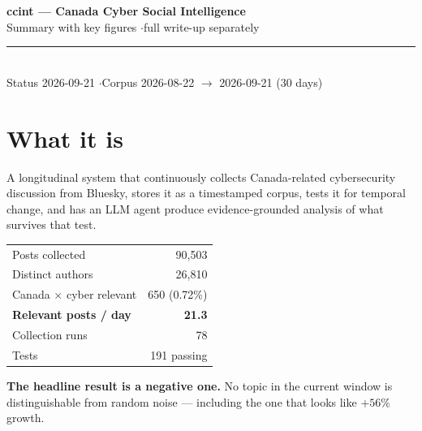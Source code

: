 \documentclass[10pt]{article}
\begin{document}
\begin{center}
{\LARGE\bfseries ccint --- Canada Cyber Social Intelligence}\\[0.3em]
{\normalsize Summary with key figures \quad$\cdot$\quad full write-up separately}\\[0.4em]
\textcolor{accent}{\rule{\textwidth}{0.9pt}}\\[0.2em]
{\footnotesize Status 2026-09-21 \quad$\cdot$\quad Corpus 2026-08-22 $\to$ 2026-09-21 (30 days)}
\end{center}
\vspace{-0.3em}

\section{What it is}

A longitudinal system that continuously collects Canada-related cybersecurity
discussion from Bluesky, stores it as a timestamped corpus, tests it for
temporal change, and has an LLM agent produce evidence-grounded analysis of
what survives that test.

\vspace{0.2em}
\begin{minipage}[t]{0.47\textwidth}
\small
\begin{tabular}{@{}lr@{}}
\toprule
Posts collected & 90{,}503 \\
Distinct authors & 26{,}810 \\
Canada $\times$ cyber relevant & 650 (0.72\%) \\
\textbf{Relevant posts / day} & \textbf{21.3} \\
Collection runs & 78 \\
Tests & 191 passing \\
\bottomrule
\end{tabular}
\end{minipage}\hfill
\begin{minipage}[t]{0.50\textwidth}
\vspace{-1.2em}
\begin{keybox}
\small
\textbf{The headline result is a negative one.} No topic in the current window
is distinguishable from random noise --- including the one that looks like
$+56\%$ growth.
\end{keybox}
\end{minipage}

\end{document}
